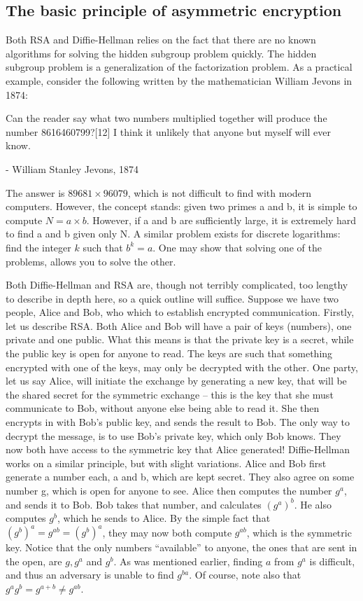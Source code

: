 \documentclass[conference]{IEEEtran}
\begin{document}
\subsection{The basic principle of asymmetric encryption}
Both RSA and Diffie-Hellman relies on the fact that there are no known algorithms for solving the hidden subgroup problem quickly.
The hidden subgroup problem is a generalization of the factorization problem.
As a practical example, consider the following written by the mathematician William Jevons in 1874:
\begin{quoting}
Can the reader say what two numbers multiplied together will produce the number 8616460799?[12] I think it unlikely that anyone but myself will ever know.
 
- William Stanley Jevons, 1874
\end{quoting}
The answer is $89681 \times 96079$, which is not difficult to find with modern computers.
However, the concept stands: given two primes a and b, it is simple to compute $N = a \times b$.
However, if a and b are sufficiently large, it is extremely hard to find a and b given only N.
A similar problem exists for discrete logarithms: find the integer $k$ such that $b^k = a$.
One may show that solving one of the problems, allows you to solve the other.

Both Diffie-Hellman and RSA are, though not terribly complicated, too lengthy to describe in depth here, so a quick outline will suffice.
Suppose we have two people, Alice and Bob, who which to establish encrypted communication.
Firstly, let us describe RSA.
Both Alice and Bob will have a pair of keys (numbers), one private and one public.
What this means is that the private key is a secret, while the public key is open for anyone to read.
The keys are such that something encrypted with one of the keys, may only be decrypted with the other.
One party, let us say Alice, will initiate the exchange by generating a new key, that will be the shared secret for the symmetric exchange -- this is the key that she must communicate to Bob, without anyone else being able to read it.
She then encrypts in with Bob's public key, and sends the result to Bob.
The only way to decrypt the message, is to use Bob's private key, which only Bob knows.
They now both have access to the symmetric key that Alice generated!
Diffie-Hellman works on a similar principle, but with slight variations.
Alice and Bob first generate a number each, a and b, which are kept secret.
They also agree on some number g, which is open for anyone to see.
Alice then computes the number $g^a$, and sends it to Bob.
Bob takes that number, and calculates $(g^a)^b$.
He also computes $g^b$, which he sends to Alice.
By the simple fact that $(g^b)^a = g^{ab} = (g^b)^a$, they may now both compute $g^{ab}$, which is the symmetric key.
Notice that the only numbers ``available'' to anyone, the ones that are sent in the open, are $g, g^a$ and $g^b$.
As was mentioned earlier, finding $a$ from $g^a$ is difficult, and thus an adversary is unable to find $g^{ba}$.
Of course, note also that $g^a g^b = g^{a+b}\neq g^{ab}$.
\end{document}
